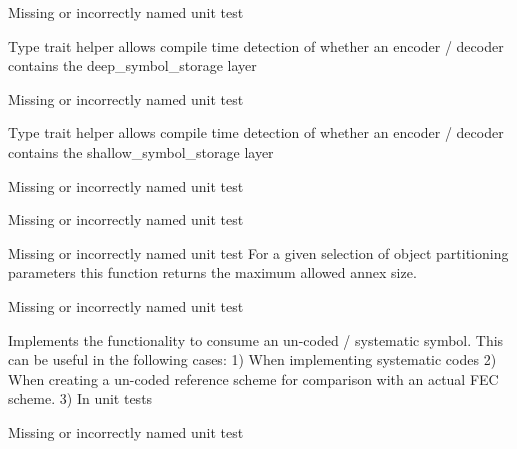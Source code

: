 \begin{DoxyRefList}
\item[\label{todo__todo000020}%
\hypertarget{todo__todo000020}{}%
Class \hyperlink{structkodo_1_1has__deep__symbol__storage}{kodo\-:\-:has\-\_\-deep\-\_\-symbol\-\_\-storage$<$ T $>$} ]Missing or incorrectly named unit test

Type trait helper allows compile time detection of whether an encoder / decoder contains the deep\-\_\-symbol\-\_\-storage layer 
\item[\label{todo__todo000021}%
\hypertarget{todo__todo000021}{}%
Class \hyperlink{structkodo_1_1has__shallow__symbol__storage}{kodo\-:\-:has\-\_\-shallow\-\_\-symbol\-\_\-storage$<$ T $>$} ]Missing or incorrectly named unit test

Type trait helper allows compile time detection of whether an encoder / decoder contains the shallow\-\_\-symbol\-\_\-storage layer 
\item[\label{todo__todo000022}%
\hypertarget{todo__todo000022}{}%
Class \hyperlink{classkodo_1_1linear__block__decoder__delayed}{kodo\-:\-:linear\-\_\-block\-\_\-decoder\-\_\-delayed$<$ Super\-Coder $>$} ]Missing or incorrectly named unit test


\item[\label{todo__todo000023}%
\hypertarget{todo__todo000023}{}%
Class \hyperlink{classkodo_1_1linear__block__encoder}{kodo\-:\-:linear\-\_\-block\-\_\-encoder$<$ Super\-Coder $>$} ]Missing or incorrectly named unit test


\item[\label{todo__todo000038}%
\hypertarget{todo__todo000038}{}%
Member \hyperlink{namespacekodo_a716a68560b2163210d157459c98baeb7}{kodo\-:\-:max\-\_\-annex\-\_\-size} (uint32\-\_\-t max\-\_\-symbols, uint32\-\_\-t max\-\_\-symbol\-\_\-size, uint32\-\_\-t object\-\_\-size)]Missing or incorrectly named unit test For a given selection of object partitioning parameters this function returns the maximum allowed annex size. 
\item[\label{todo__todo000027}%
\hypertarget{todo__todo000027}{}%
Class \hyperlink{classkodo_1_1nocode__decoder}{kodo\-:\-:nocode\-\_\-decoder$<$ Super\-Coder $>$} ]Missing or incorrectly named unit test

Implements the functionality to consume an un-\/coded / systematic symbol. This can be useful in the following cases\-: 1) When implementing systematic codes 2) When creating a un-\/coded reference scheme for comparison with an actual F\-E\-C scheme. 3) In unit tests  
\item[\label{todo__todo000028}%
\hypertarget{todo__todo000028}{}%
Class \hyperlink{classkodo_1_1nocode__encoder}{kodo\-:\-:nocode\-\_\-encoder$<$ Super\-Coder $>$} ]Missing or incorrectly named unit test


\end{DoxyRefList}

